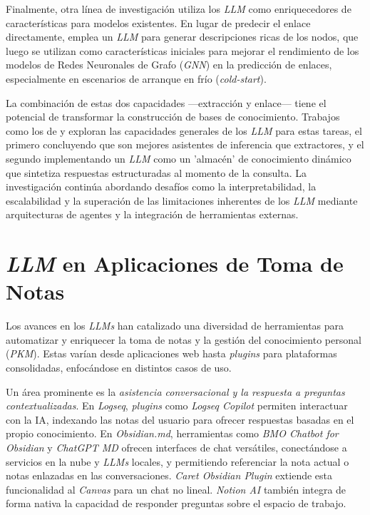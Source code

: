 Finalmente, otra línea de investigación utiliza los \textit{LLM} como enriquecedores de características para modelos existentes. En lugar de predecir el enlace directamente, \parencite{parkEnhancingFutureLink2024} emplea un \textit{LLM} para generar descripciones ricas de los nodos, que luego se utilizan como características iniciales para mejorar el rendimiento de los modelos de Redes Neuronales de Grafo (\textit{GNN}) en la predicción de enlaces, especialmente en escenarios de arranque en frío (\textit{cold-start}).

La combinación de estas dos capacidades —extracción y enlace— tiene el potencial de transformar la construcción de bases de conocimiento. Trabajos como los de \parencite{zhuLLMsKnowledgeGraph2024} y \parencite{machadoLLMStoreLeveraging2024} exploran las capacidades generales de los \textit{LLM} para estas tareas, el primero concluyendo que son mejores asistentes de inferencia que extractores, y el segundo implementando un \textit{LLM} como un 'almacén' de conocimiento dinámico que sintetiza respuestas estructuradas al momento de la consulta. La investigación continúa abordando desafíos como la interpretabilidad, la escalabilidad y la superación de las limitaciones inherentes de los \textit{LLM} mediante arquitecturas de agentes y la integración de herramientas externas.

\section{\textit{LLM} en Aplicaciones de Toma de Notas}
\label{sec:integracion_llm_pkm}
Los avances en los \textit{LLMs} han catalizado una diversidad de herramientas para automatizar y enriquecer la toma de notas y la gestión del conocimiento personal (\textit{PKM}). Estas varían desde aplicaciones web hasta \textit{plugins} para plataformas consolidadas, enfocándose en distintos casos de uso.

Un área prominente es la \textit{asistencia conversacional y la respuesta a preguntas contextualizadas}. En \textit{Logseq}, \textit{plugins} como \textit{Logseq Copilot} permiten interactuar con la IA, indexando las notas del usuario para ofrecer respuestas basadas en el propio conocimiento. En \textit{Obsidian.md}, herramientas como \textit{BMO Chatbot for Obsidian} y \textit{ChatGPT MD} ofrecen interfaces de chat versátiles, conectándose a servicios en la nube y \textit{LLMs} locales, y permitiendo referenciar la nota actual o notas enlazadas en las conversaciones. \textit{Caret Obsidian Plugin} extiende esta funcionalidad al \textit{Canvas} para un chat no lineal. \textit{Notion AI} también integra de forma nativa la capacidad de responder preguntas sobre el espacio de trabajo.

